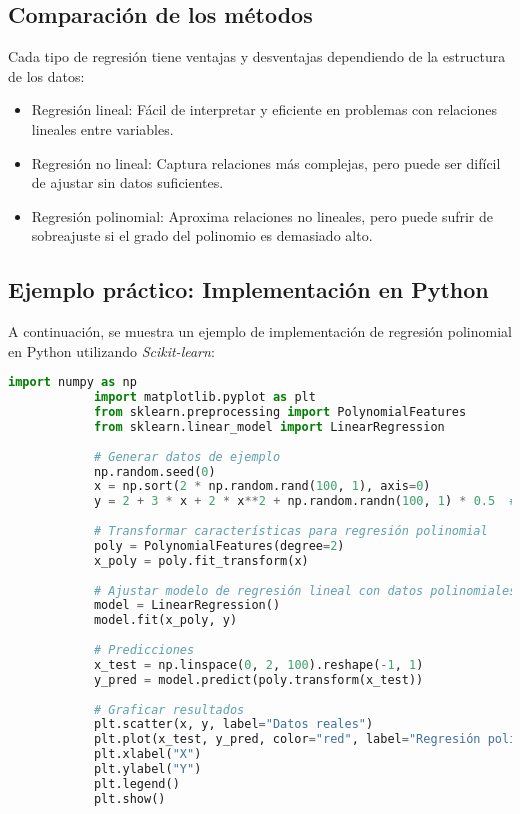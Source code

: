 \begin{itemize}
		\subsection{Comparación de los métodos}
		
		Cada tipo de regresión tiene ventajas y desventajas dependiendo de la estructura de los datos:
		
		\begin{itemize}
			\item Regresión lineal: Fácil de interpretar y eficiente en problemas con relaciones lineales entre variables.
			\item Regresión no lineal: Captura relaciones más complejas, pero puede ser difícil de ajustar sin datos suficientes.
			\item Regresión polinomial: Aproxima relaciones no lineales, pero puede sufrir de sobreajuste si el grado del polinomio es demasiado alto.
		\end{itemize}
		
		\subsection{Ejemplo práctico: Implementación en Python}
		
		A continuación, se muestra un ejemplo de implementación de regresión polinomial en Python utilizando \textit{Scikit-learn}:
		
		\begin{lstlisting}[language=Python, caption={Regresión polinomial en Python}]
			import numpy as np
			import matplotlib.pyplot as plt
			from sklearn.preprocessing import PolynomialFeatures
			from sklearn.linear_model import LinearRegression
			
			# Generar datos de ejemplo
			np.random.seed(0)
			x = np.sort(2 * np.random.rand(100, 1), axis=0)
			y = 2 + 3 * x + 2 * x**2 + np.random.randn(100, 1) * 0.5  # Relación polinomial
			
			# Transformar características para regresión polinomial
			poly = PolynomialFeatures(degree=2)
			x_poly = poly.fit_transform(x)
			
			# Ajustar modelo de regresión lineal con datos polinomiales
			model = LinearRegression()
			model.fit(x_poly, y)
			
			# Predicciones
			x_test = np.linspace(0, 2, 100).reshape(-1, 1)
			y_pred = model.predict(poly.transform(x_test))
			
			# Graficar resultados
			plt.scatter(x, y, label="Datos reales")
			plt.plot(x_test, y_pred, color="red", label="Regresión polinomial")
			plt.xlabel("X")
			plt.ylabel("Y")
			plt.legend()
			plt.show()
		\end{lstlisting}
		

\end{itemize}
